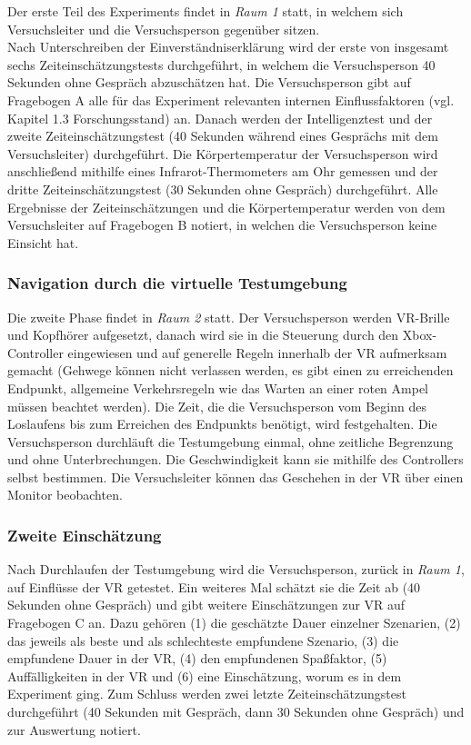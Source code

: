 \documentclass{Paper}
\begin{document}
Der erste Teil des Experiments findet in \textit{Raum 1} statt, in welchem sich Versuchsleiter und die Versuchsperson gegenüber sitzen.\\
Nach Unterschreiben der Einverständniserklärung wird der erste von insgesamt sechs Zeiteinschätzungstests durchgeführt, in welchem die Versuchsperson 40 Sekunden ohne Gespräch abzuschätzen hat. Die Versuchsperson gibt auf Fragebogen A alle für das Experiment relevanten internen Einflussfaktoren (vgl. Kapitel 1.3  Forschungsstand) an.
Danach werden der Intelligenztest und der zweite Zeiteinschätzungstest (40 Sekunden während eines Gesprächs mit dem Versuchsleiter) durchgeführt. Die Körpertemperatur der Versuchsperson wird anschließend mithilfe eines Infrarot-Thermometers am Ohr gemessen und der dritte Zeiteinschätzungstest (30 Sekunden ohne Gespräch) durchgeführt.
Alle Ergebnisse der Zeiteinschätzungen und die
Körpertemperatur werden von dem Versuchsleiter auf Fragebogen B notiert, in welchen die Versuchsperson keine Einsicht hat.

\subsubsection{Navigation durch die virtuelle Testumgebung}
Die zweite Phase findet in \textit{Raum 2} statt. Der Versuchsperson werden VR-Brille und Kopfhörer aufgesetzt, danach wird sie in die Steuerung durch den Xbox-Controller eingewiesen und auf generelle Regeln innerhalb der VR aufmerksam gemacht (Gehwege können nicht verlassen werden, es gibt einen zu erreichenden Endpunkt, allgemeine Verkehrsregeln wie das Warten an einer roten Ampel müssen beachtet werden). 
Die Zeit, die die Versuchsperson vom Beginn des Loslaufens bis zum Erreichen des Endpunkts benötigt, wird festgehalten.
Die Versuchsperson durchläuft die Testumgebung einmal, ohne zeitliche Begrenzung und ohne Unterbrechungen. Die Geschwindigkeit kann sie mithilfe des Controllers selbst bestimmen. Die Versuchsleiter können das Geschehen in der VR über einen Monitor beobachten.

\subsubsection{Zweite Einschätzung}
Nach Durchlaufen der Testumgebung wird die Versuchsperson, zurück in \textit{Raum 1}, auf Einflüsse der VR getestet. Ein weiteres Mal schätzt sie die Zeit ab (40 Sekunden ohne Gespräch) und gibt weitere Einschätzungen zur VR auf Fragebogen C an. Dazu gehören (1) die geschätzte Dauer einzelner Szenarien, (2) das jeweils als beste und als schlechteste empfundene Szenario, (3)  die empfundene Dauer in der VR, (4) den empfundenen Spaßfaktor, (5) Auffälligkeiten in der VR und (6) eine Einschätzung, worum es in dem Experiment ging.
Zum Schluss werden zwei letzte Zeiteinschätzungstest durchgeführt (40 Sekunden mit Gespräch, dann 30 Sekunden ohne Gespräch) und zur Auswertung notiert.
\newpage
\end{document}
